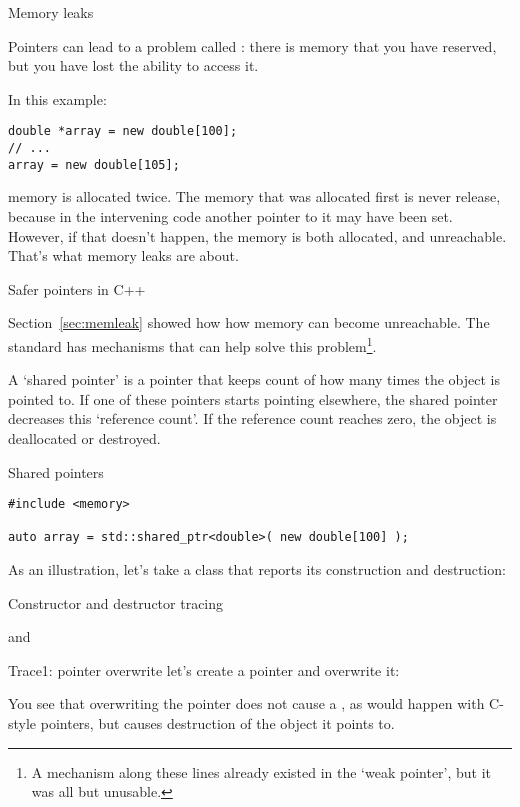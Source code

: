  {Memory leaks}
\label{sec:memleak}

Pointers can lead to a problem called :
there is memory that you have reserved, but you have lost the ability
to access it.

In this example:
\begin{verbatim}
double *array = new double[100];
// ...
array = new double[105];
\end{verbatim}
memory is allocated twice. The memory that was allocated first is
never release, because in the intervening code another pointer to it
may have been set. However, if that doesn't happen, the memory is both
allocated, and unreachable. That's what memory leaks are about.

 {Safer pointers in C++}
\label{sec:shared_ptr}

Section~\ref{sec:memleak} showed how how memory can become
unreachable. The  standard has mechanisms that can
help solve this problem\footnote{A mechanism along these lines already
  existed in the `weak pointer', but it was all but unusable.}.

A `shared pointer' is a pointer that keeps count of how many times the
object is pointed to. If one of these pointers starts pointing
elsewhere, the shared pointer decreases this `reference count'. If the
reference count reaches zero, the object is deallocated or destroyed.

\begin{block}{Shared pointers}
  \label{sl:shared-ptr}
\begin{verbatim}
#include <memory>

auto array = std::shared_ptr<double>( new double[100] );
\end{verbatim}
\end{block}

As an illustration, let's take a class that reports its construction
and destruction:
%
\begin{block}{Constructor and destructor tracing}
  \label{sl:construct-destruct-trace}
\end{block}

%
and
\begin{block}{Trace1: pointer overwrite}
  \label{sl:shared-ptr-overwrite}
  let's create a pointer and overwrite it:
\end{block}
%
You see that overwriting the pointer does not cause a
, as would happen with C-style pointers, but
causes destruction of the object it points to.

